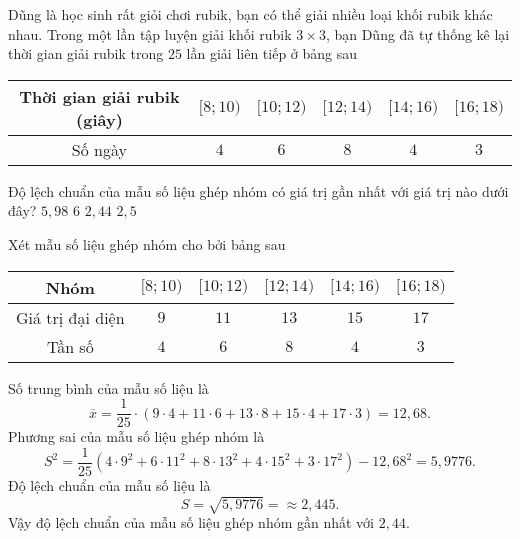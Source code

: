 \begin{ex}
	Dũng là học sinh rất giỏi chơi rubik, bạn có thể giải nhiều loại khối rubik khác nhau. Trong một lần tập luyện giải khối rubik $3\times 3$, bạn Dũng đã tự thống kê lại thời gian giải	rubik trong $25$ lần giải liên tiếp ở bảng sau
	\begin{center}
		\begin{tabular}{|c|c|c|c|c|c|}
			\hline
			Thời gian giải rubik (giây) & $[8;10)$ & $[10;12)$ & $[12;14)$ & $[14;16)$ & $[16;18)$ \\
			\hline
			Số ngày                     & $4$      & $6$       & $8$       & $4$       & $3$       \\
			\hline
		\end{tabular}
	\end{center}
	Độ lệch chuẩn của mẫu số liệu ghép nhóm có giá trị gần nhất với giá trị nào dưới đây?
	\choice
	{$5{,}98$}
	{$6$}
	{\True $2{,}44$}
	{$2{,}5$}
	\loigiai
	{
	Xét mẫu số liệu ghép nhóm cho bởi bảng sau
	\begin{center}
		\begin{tabular}{|c|c|c|c|c|c|}
			\hline
			Nhóm             & $[8;10)$ & $[10;12)$ & $[12;14)$ & $[14;16)$ & $[16;18)$ \\
			\hline
			Giá trị đại diện & $9$      & $11$      & $13$      & $15$      & $17$      \\
			\hline
			Tần số           & $4$      & $6$       & $8$       & $4$       & $3$       \\
			\hline
		\end{tabular}
	\end{center}
	Số trung bình của mẫu số liệu là
	$$\overline{x}=\dfrac{1}{25}\cdot (9\cdot 4+11\cdot 6+13\cdot 8+15\cdot 4+17\cdot 3)=12{,}68.$$
	Phương sai của mẫu số liệu ghép nhóm là
	$$S^2=\dfrac{1}{25}\left(4\cdot 9^2+6\cdot 11^2+8\cdot 13^2+4\cdot 15^2+3\cdot 17^2\right)-12{,}68^2=5{,}9776.$$
	Độ lệch chuẩn của mẫu số liệu là
	$$S=\sqrt{5{,}9776}=\approx 2{,}445.$$
	Vậy độ lệch chuẩn của mẫu số liệu ghép nhóm gần nhất với $2{,}44$.
	}
\end{ex}

